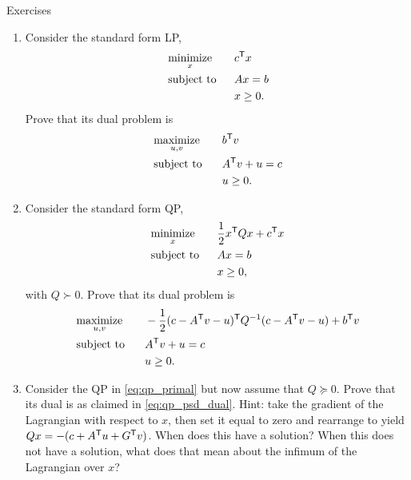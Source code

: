 \begin{xcb}{Exercises}
\begin{enumerate}[label=\thechapter.\arabic*]
\settowidth{\leftmargini}{0.00.\hskip\labelsep}
\item \label{ex:lp_std_dual}
  Consider the standard form LP,
  \begin{alignat*}{2}
  &\operatorname*{minimize}_x \quad && c^{\mathsf{T}} x \\
  &\operatorname{subject\,\,to} && Ax = b \\
  & && x \geq 0.
  \end{alignat*}
  Prove that its dual problem is 
  \begin{alignat*}{2}
  &\operatorname*{maximize}_{u,v} \quad && b^{\mathsf{T}} v \\
  &\operatorname{subject\,\,to} && A^{\mathsf{T}} v + u = c \\
  & && u \geq 0.
  \end{alignat*}

\item \label{ex:qp_std_dual} 
  Consider the standard form QP,
  \begin{alignat*}{2}
  &\operatorname*{minimize}_x \quad && \frac{1}{2} x^{\mathsf{T}} Q x + c^{\mathsf{T}} x \\
  &\operatorname{subject\,\,to} && Ax = b \\
  & && x \geq 0,
  \end{alignat*}
  with $Q \succ 0$. Prove that its dual problem is
  \begin{alignat*}{2}
  &\operatorname*{maximize}_{u,v} \quad && -\frac{1}{2} (c - A^{\mathsf{T}} v - u)^{\mathsf{T}} Q^{-1} (c - A^{\mathsf{T}} v
  - u) + b^{\mathsf{T}} v \\
  &\operatorname{subject\,\,to} && A^{\mathsf{T}} v + u = c \\
  & && u \geq 0.
  \end{alignat*}

\item \label{ex:qp_psd_dual} 
  Consider the QP in \eqref{eq:qp_primal} but now assume that $Q \succeq
  0$. Prove that its dual is as claimed in \eqref{eq:qp_psd_dual}. Hint: take
  the gradient of the Lagrangian with respect to $x$, then set it equal to zero
  and rearrange to yield $Qx = -(c + A^{\mathsf{T}} u + G^{\mathsf{T}} v)$. When does this have a  
  solution? When this does not have a solution, what does that mean about the 
  infimum of the Lagrangian over $x$?   


\end{enumerate}
\end{xcb}
